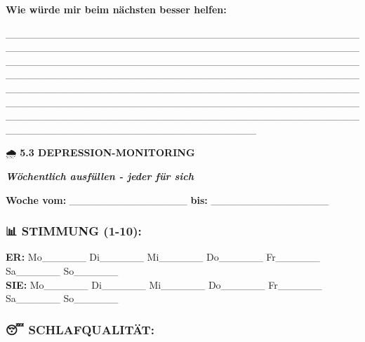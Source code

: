 \textbf{Wie würde mir beim nächsten besser helfen:}

\_\_\_\_\_\_\_\_\_\_\_\_\_\_\_\_\_\_\_\_\_\_\_\_\_\_\_\_\_\_\_\_\_\_\_\_\_\_\_\_\_\_\_\_\_\_\_\_\_\_\_\_\_\_\_\_\_\_\_\_\_\_\_\_\_\_\_\_\_\_\_\_\_\_\_\_\_\_\_\_\_\_\_\_\_\_\_\_\_\_\_\_\_\_\_\_\_\_\_\_\_\_\_\_\_\_\_\_\_\_\_\_\_\_\_\_\_\_\_\_\_\_\_\_\_\_\_\_\_\_\_\_\_\_\_\_\_\_\_\_\_\_\_\_\_\_\_\_\_\_\_\_\_\_\_\_\_\_\_\_\_\_\_\_\_\_\_\_\_\_\_\_\_\_\_\_\_\_\_\_\_\_\_\_\_\_\_\_\_\_\_\_\_\_\_\_\_\_\_\_\_\_\_\_\_\_\_\_\_\_\_\_\_\_\_\_\_\_\_\_\_\_\_\_\_\_\_\_\_\_\_\_\_\_\_\_\_\_\_\_\_\_\_\_\_\_\_\_\_\_\_\_\_\_\_\_\_\_\_\_\_\_\_\_\_\_\_\_\_\_\_\_\_\_\_\_\_\_\_\_\_\_\_\_\_\_\_\_\_\_\_\_\_\_\_\_\_\_\_\_\_\_\_\_\_\_\_\_\_\_\_\_\_\_\_\_\_\_\_\_\_\_\_\_\_\_\_\_\_\_\_\_\_\_\_\_\_\_\_\_\_\_\_\_\_\_\_\_\_\_\_\_\_\_\_\_\_\_\_\_\_\_\_\_\_\_\_\_\_\_

🌧️ \textbf{5.3 DEPRESSION-MONITORING}

\emph{\textbf{Wöchentlich ausfüllen - jeder für sich}}

\textbf{Woche vom:} \_\_\_\_\_\_\_\_\_\_\_\_\_\_\_\_ \textbf{bis:} \_\_\_\_\_\_\_\_\_\_\_\_\_\_\_\_

\hypertarget{section-6}{%
\subsubsection{}\label{section-6}}

\hypertarget{stimmung-1-10}{%
\subsubsection{\texorpdfstring{\textbf{📊 STIMMUNG (1-10):}}{📊 STIMMUNG (1-10):}}\label{stimmung-1-10}}

\textbf{ER:} Mo\_\_\_\_\_\_ Di\_\_\_\_\_\_ Mi\_\_\_\_\_\_ Do\_\_\_\_\_\_ Fr\_\_\_\_\_\_ Sa\_\_\_\_\_\_ So\_\_\_\_\_\_\\
\textbf{SIE:} Mo\_\_\_\_\_\_ Di\_\_\_\_\_\_ Mi\_\_\_\_\_\_ Do\_\_\_\_\_\_ Fr\_\_\_\_\_\_ Sa\_\_\_\_\_\_ So\_\_\_\_\_\_

\hypertarget{section-7}{%
\subsubsection{}\label{section-7}}

\hypertarget{schlafqualituxe4t-1}{%
\subsubsection{\texorpdfstring{\textbf{😴 SCHLAFQUALITÄT:}}{😴 SCHLAFQUALITÄT:}}\label{schlafqualituxe4t-1}}

